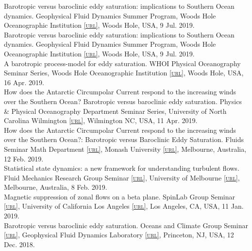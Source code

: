 \documentclass[10pt, letter]{article}
\def\www{http://www.navidconstantinou.com}
\newcommand{\html}[1]{\href{#1}{\scriptsize\textsc{[url]}}}
\newcommand{\pdf}[1]{\href{#1}{\scriptsize\textsc{[pdf]}}}
\renewcommand{\pdf}[1]{\href{#1}{{\fontspec{FontAwesome}{}}}}
\newcommand{\years}[1]{\marginnote{\scriptsize #1}}
\begin{document}
Barotropic versus baroclinic eddy saturation: implications to Southern Ocean dynamics. Geophysical Fluid Dynamics Summer Program, Woods Hole Oceanographic Institution \html{https://www.whoi.edu/gfd}, Woods Hole, USA, 9 Jul. 2019. \href{\www/presentations/EddySaturation-GFD-2019.pdf}{{}}\\[.2cm]
Barotropic versus baroclinic eddy saturation: implications to Southern Ocean dynamics. Geophysical Fluid Dynamics Summer Program, Woods Hole Oceanographic Institution \html{https://www.whoi.edu/gfd}, Woods Hole, USA, 9 Jul. 2019. \href{\www/presentations/EddySaturation-GFD-2019.pdf}{{}}\\[.2cm]
A barotropic process-model for eddy saturation. WHOI Physical Oceanography Seminar Series, Woods Hole Oceanographic Institution \html{https://www.whoi.edu}, Woods Hole, USA, 16 Apr. 2019. \href{http://www.navidconstantinou.com/presentations/WHOI_Apr2019.pdf}{{}}\\[.2cm]
How does the Antarctic Circumpolar Current respond to the increasing winds over the Southern Ocean?
Barotropic versus baroclinic eddy saturation. Physics \& Physical Oceanography Department Seminar Series, University of North Carolina Wilmington \html{https://uncw.edu/phy/}, Wilmington NC, USA, 11 Apr. 2019.\\[.2cm]
How does the Antarctic Circumpolar Current respond to the increasing winds over the Southern Ocean?: Barotropic versus Baroclinic Eddy Saturation. Fluids Seminar Math Department \html{https://www.monash.edu/science/schools/mathematical-sciences}, Monash University \html{https://www.monash.edu}, Melbourne, Australia, 12 Feb. 2019.\\[.2cm]
\years{2019} Statistical state dynamics: a new framework for understanding turbulent flows. Fluid Mechanics Research Group Seminar \html{https://fluids.eng.unimelb.edu.au}, University of Melbourne \html{https://www.unimelb.edu.au}, Melbourne, Australia, 8 Feb. 2019.\\[.2cm]
Magnetic suppression of zonal flows on a beta plane. SpinLab Group Seminar \html{http://spinlab.ess.ucla.edu/}, University of California Los Angeles \html{https://www.ucla.edu}, Los Angeles, CA, USA, 11 Jan. 2019.  \pdf{\www/presentations/GFDL_Dec2018.pdf}\\[.2cm]
\years{2018} Barotropic versus baroclinic eddy saturation. Oceans and Climate Group Seminar \html{https://www.gfdl.noaa.gov/ocean-and-cryosphere-division/}, Geophysical Fluid Dynamics Laboratory \html{https://www.gfdl.noaa.gov/}, Princeton, NJ, USA, 12 Dec. 2018.  \pdf{\www/presentations/GFDL_Dec2018.pdf}\\[.2cm]
\end{document}
